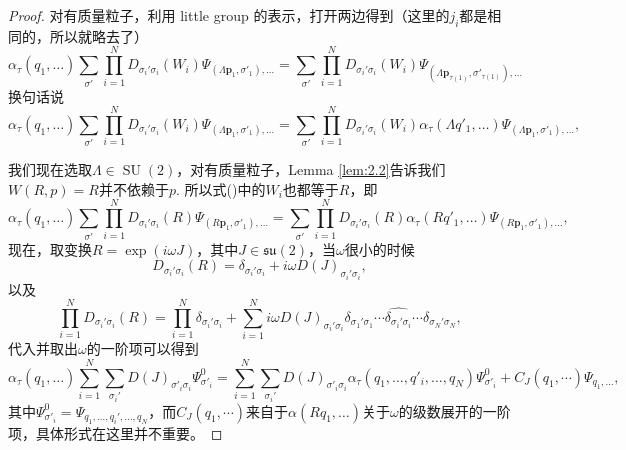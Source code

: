 \documentclass[11pt]{article}
\theoremstyle{definition}
\theoremstyle{plain}
\begin{document}
\begin{proof}

对有质量粒子，利用 little group 的表示，打开两边得到（这里的$j_i$都是相同的，所以就略去了）
\[
	\alpha_\tau(q_1,\dots)\sum_{\sigma'}\prod_{i=1}^N D_{\sigma_i'\sigma_i}(W_i)\Psi_{(\Lambda \bm{p}_1,\sigma'_1),\dots}=\sum_{\sigma'}\prod_{i=1}^N D_{\sigma_i'\sigma_i}(W_i)\Psi_{(\Lambda \bm{p}_{\tau(1)},\sigma'_{\tau(1)}),\dots}
\]
换句话说
\begin{equation}
	\alpha_\tau(q_1,\dots)\sum_{\sigma'}\prod_{i=1}^N D_{\sigma_i'\sigma_i}(W_i)\Psi_{(\Lambda \bm{p}_1,\sigma'_1),\dots}=\sum_{\sigma'}\prod_{i=1}^N D_{\sigma_i'\sigma_i}(W_i)\alpha_\tau(\Lambda q'_1,\dots)\Psi_{(\Lambda \bm{p}_{1},\sigma'_{1}),\dots},
\end{equation}

我们现在选取$\Lambda\in \operatorname{SU}(2)$，对有质量粒子，Lemma \ref{lem:2.2}告诉我们$W(R,p)=R$并不依赖于$p$. 所以式(\theequation)中的$W_i$也都等于$R$，即
\[
	\alpha_\tau(q_1,\dots)\sum_{\sigma'}\prod_{i=1}^N D_{\sigma_i'\sigma_i}(R)\Psi_{(R \bm{p}_1,\sigma'_1),\dots}=\sum_{\sigma'}\prod_{i=1}^N D_{\sigma_i'\sigma_i}(R)\alpha_\tau(R q'_1,\dots)\Psi_{(R \bm{p}_{1},\sigma'_{1}),\dots},
\]
现在，取变换$R=\exp(i\omega J)$，其中$J\in \mathfrak{su}(2)$，当$\omega$很小的时候
\[
	D_{\sigma_i'\sigma_i}(R)=\delta_{\sigma_i'\sigma_i}+i\omega D(J)_{\sigma_i'\sigma_i},
\]
以及
\[
	\prod_{i=1}^N D_{\sigma_i'\sigma_i}(R)=\prod_{i=1}^N \delta_{\sigma_i'\sigma_i}+\sum_{i=1}^Ni\omega D(J)_{\sigma_i'\sigma_i}\delta_{\sigma_1'\sigma_1}\cdots \widehat{\delta_{\sigma_i'\sigma_i}}\cdots \delta_{\sigma_N'\sigma_N},
\]
代入并取出$\omega$的一阶项可以得到
\[
	\alpha_\tau(q_1,\dots)\sum_{i=1}^N \sum_{\sigma_i'}D(J)_{\sigma'_i \sigma_i}\Psi_{\sigma'_i}^0=\sum_{i=1}^N\sum_{\sigma_i'}D(J)_{\sigma'_i \sigma_i}\alpha_\tau(q_1,\dots,q'_i,\dots,q_N)\Psi_{\sigma'_i}^0+C_J(q_1,\cdots) \Psi_{q_1,\dots},
\]
其中$\Psi_{\sigma'_i}^0=\Psi_{ q_1,\dots, q_i',\dots, q_N}$，而$C_J(q_1,\cdots)$来自于$\alpha(Rq_1,\dots)$关于$\omega$的级数展开的一阶项，具体形式在这里并不重要。


\end{proof}
\end{document}
